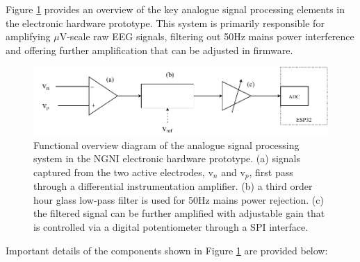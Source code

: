 Figure \ref{fig:analogue-system-c4} provides an overview of the key analogue signal processing elements in the electronic hardware prototype. This system is primarily responsible for amplifying $\mu$V-scale raw EEG signals, filtering out 50Hz mains power interference and offering further amplification that can be adjusted in firmware. 

\begin{figure}
    \centering
    \includegraphics[width=\textwidth]{analogue-system}
    \caption[Functional overview diagram of the analogue signal processing system in the NGNI electronic hardware prototype.]{Functional overview diagram of the analogue signal processing system in the NGNI electronic hardware prototype. (a) signals captured from the two active electrodes, $\textrm{v}_n$ and $\textrm{v}_p$, first pass through a differential instrumentation amplifier. (b) a third order hour glass low-pass filter is used for 50Hz mains power rejection. (c) the filtered signal can be further amplified with adjustable gain that is controlled via a digital potentiometer through a SPI interface.}
    \label{fig:analogue-system-c4}
\end{figure}

Important details of the components shown in Figure \ref{fig:analogue-system-c4} are provided below:

